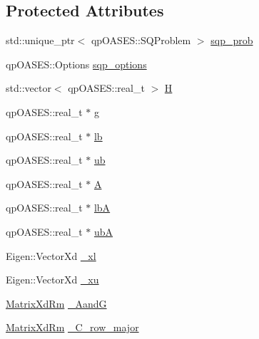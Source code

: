 \subsection*{Protected Attributes}
\begin{DoxyCompactItemize}
\item 
std\+::unique\+\_\+ptr$<$ qp\+O\+A\+S\+E\+S\+::\+S\+Q\+Problem $>$ \hyperlink{classocra_1_1OneLevelSolverWithQPOASES_ad432bd42a6211d668efc3b2e2d3df238}{sqp\+\_\+prob}
\item 
qp\+O\+A\+S\+E\+S\+::\+Options \hyperlink{classocra_1_1OneLevelSolverWithQPOASES_ace333e6d7333a5bcd9c7be5bc7d98c7b}{sqp\+\_\+options}
\item 
std\+::vector$<$ qp\+O\+A\+S\+E\+S\+::real\+\_\+t $>$ \hyperlink{classocra_1_1OneLevelSolverWithQPOASES_aba3bdf7d777d9e3e8015570652cf396a}{H}
\item 
qp\+O\+A\+S\+E\+S\+::real\+\_\+t $\ast$ \hyperlink{classocra_1_1OneLevelSolverWithQPOASES_a56fea8397d0c6b40fee373d8863f0b26}{g}
\item 
qp\+O\+A\+S\+E\+S\+::real\+\_\+t $\ast$ \hyperlink{classocra_1_1OneLevelSolverWithQPOASES_a82eaebae8f92464066e9b5348b1737f9}{lb}
\item 
qp\+O\+A\+S\+E\+S\+::real\+\_\+t $\ast$ \hyperlink{classocra_1_1OneLevelSolverWithQPOASES_a53854c9775b3ff65f4a0621bab17613c}{ub}
\item 
qp\+O\+A\+S\+E\+S\+::real\+\_\+t $\ast$ \hyperlink{classocra_1_1OneLevelSolverWithQPOASES_a8263c27c6bda731ab9dc9550a668e491}{A}
\item 
qp\+O\+A\+S\+E\+S\+::real\+\_\+t $\ast$ \hyperlink{classocra_1_1OneLevelSolverWithQPOASES_a268dd33567d130672824404fdf98882a}{lbA}
\item 
qp\+O\+A\+S\+E\+S\+::real\+\_\+t $\ast$ \hyperlink{classocra_1_1OneLevelSolverWithQPOASES_a2cb624cfce8e1940c5107251418ee7dd}{ubA}
\item 
Eigen\+::\+Vector\+Xd \hyperlink{classocra_1_1OneLevelSolverWithQPOASES_a67a41fa1b101ce2885012b796c8bfe47}{\+\_\+xl}
\item 
Eigen\+::\+Vector\+Xd \hyperlink{classocra_1_1OneLevelSolverWithQPOASES_a23dd435ea8582fc67bf77373e0afc3e0}{\+\_\+xu}
\item 
\hyperlink{group__solver_ga70eb87299c2fc1db3c4aac05df67d889}{Matrix\+Xd\+Rm} \hyperlink{classocra_1_1OneLevelSolverWithQPOASES_ae427c9c48cc3538994f0c2b6b06da7d6}{\+\_\+\+AandG}
\item 
\hyperlink{group__solver_ga70eb87299c2fc1db3c4aac05df67d889}{Matrix\+Xd\+Rm} \hyperlink{classocra_1_1OneLevelSolverWithQPOASES_a5ad3c2a2670e8d7862735fefe2df6553}{\+\_\+\+C\+\_\+row\+\_\+major}

\end{DoxyCompactItemize}
